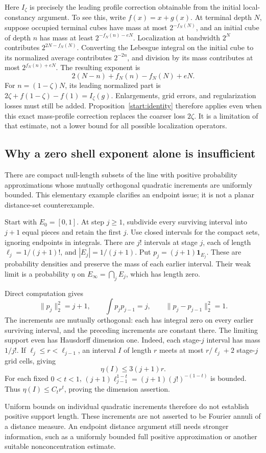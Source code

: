 Here \(I_\zeta\) is precisely the leading profile correction obtainable
from the initial local-constancy argument. To see this, write \(f(x)=x+g(x)\).
At terminal depth \(N\), suppose occupied terminal cubes have mass at most
\(2^{-f_N(N)}\), and an initial cube of depth \(n\) has mass at least
\(2^{-f_N(n)-eN}\). Localization at bandwidth \(2^N\) contributes
\(2^{2N-f_N(N)}\). Converting the Lebesgue integral on the initial cube
to its normalized average contributes \(2^{-2n}\), and division by its
mass contributes at most \(2^{f_N(n)+eN}\). The resulting exponent is
\[
 2(N-n)+f_N(n)-f_N(N)+eN.
\]
For \(n=(1-\zeta)N\), its leading normalized part is
\(2\zeta+f(1-\zeta)-f(1)=I_\zeta(g)\). Enlargements, grid errors,
and regularization losses must still be added. Proposition~\ref{start:identity}
therefore applies even when this exact mass-profile correction replaces
the coarser loss \(2\zeta\). It is a limitation of that estimate, not
a lower bound for all possible localization operators.

\subsection{Why a zero shell exponent alone is insufficient}
There are compact null-length subsets of the line with positive probability
approximations whose mutually orthogonal quadratic increments are uniformly
bounded. This elementary example clarifies an endpoint issue; it is not a
planar distance-set counterexample.

Start with \(E_0=[0,1]\). At step \(j\ge1\), subdivide every surviving
interval into \(j+1\) equal pieces and retain the first \(j\). Use closed
intervals for the compact sets, ignoring endpoints in integrals. There are
\(j!\) intervals at stage \(j\), each of length
\(\ell_j=1/(j+1)!\), and \(|E_j|=1/(j+1)\). Put
\(p_j=(j+1)\mathbf1_{E_j}\). These are probability densities and preserve
the mass of each earlier interval. Their weak limit is a probability
\(\eta\) on \(E_\infty=\bigcap_j E_j\), which has length zero.

Direct computation gives
\[
 \|p_j\|_2^2=j+1,\qquad \int p_jp_{j-1}=j,
 \qquad \|p_j-p_{j-1}\|_2^2=1.
\]
The increments are mutually orthogonal: each has integral zero on every
earlier surviving interval, and the preceding increments are constant
there. The limiting support even has Hausdorff dimension one. Indeed,
each stage-\(j\) interval has mass \(1/j!\). If
\(\ell_j\le r<\ell_{j-1}\), an interval \(I\) of length \(r\) meets at most
\(r/\ell_j+2\) stage-\(j\) grid cells, giving
\[
 \eta(I)\le3(j+1)r.
\]
For each fixed \(0<t<1\),
\((j+1)\ell_{j-1}^{1-t}=(j+1)(j!)^{-(1-t)}\) is bounded.
Thus \(\eta(I)\le C_t r^t\), proving the dimension assertion.

Uniform bounds on individual quadratic increments therefore do not
establish positive support length. These increments are not asserted to
be Fourier annuli of a distance measure. An endpoint distance argument
still needs stronger information, such as a uniformly bounded full
positive approximation or another suitable nonconcentration estimate.
